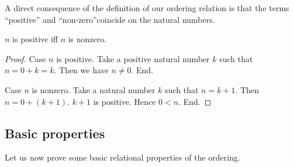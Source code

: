 \documentclass[../../arithmetic.tex]{subfiles}
\begin{document}
  \noindent A direct consequence of the definition of our ordering relation is
  that the terms \enquote{positive} and \enquote{non-zero}coincide on the
  natural numbers.

  \begin{forthel}
    \begin{proposition}\label{Arithmetic_02_01_115117}
      $n$ is positive iff $n$ is nonzero.
    \end{proposition}
    \begin{proof}
      Case $n$ is positive.
        Take a positive natural number $k$ such that $n = 0 + k = k$.
        Then we have $n \neq 0$.
      End.

      Case $n$ is nonzero.
        Take a natural number $k$ such that $n = k + 1$.
        Then $n = 0 + (k + 1)$.
        $k + 1$ is positive.
        Hence $0 < n$.
      End.
    \end{proof}
  \end{forthel}


  \subsection{Basic properties}

  Let us now prove some basic relational properties of the
  ordering.
\end{document}
